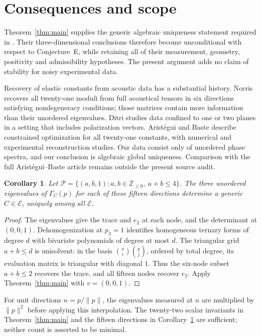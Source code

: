 \documentclass[11pt]{amsart}
\newtheorem{corollary}[theorem]{Corollary}
\theoremstyle{remark}
\newcommand{\E}{\mathcal E}
\begin{document}
\section{Consequences and scope}

Theorem~\ref{thm:main} supplies the generic algebraic uniqueness statement required in \cite[Theorems~A and~B]{dehoop2025}. Their three-dimensional conclusions therefore become unconditional with respect to Conjecture~E, while retaining all of their measurement, geometry, positivity and admissibility hypotheses. The present argument adds no claim of stability for noisy experimental data.

Recovery of elastic constants from acoustic data has a substantial history. Norris \cite{norris1989} recovers all twenty-one moduli from full acoustical tensors in six directions satisfying nondegeneracy conditions; those matrices contain more information than their unordered eigenvalues. Ditri \cite{ditri1994} studies data confined to one or two planes in a setting that includes polarization vectors. Arist\'egui and Baste \cite{aristegui1997} describe constrained optimization for all twenty-one constants, with numerical and experimental reconstruction studies. Our data consist only of unordered phase spectra, and our conclusion is algebraic global uniqueness. Comparison with the full Arist\'egui--Baste article remains outside the present source audit.

\begin{corollary}\label{cor:directions}
Let $\mathcal P=\{(a,b,1):a,b\in\mathbb Z_{\geq0},\ a+b\leq4\}$. The three unordered eigenvalues of $\Gamma_C(p)$ for each of these fifteen directions determine a generic $C\in\E$, uniquely among all $\E$.
\end{corollary}
\begin{proof}
The eigenvalues give the trace and $e_2$ at each node, and the determinant at $(0,0,1)$. Dehomogenization at $p_3=1$ identifies homogeneous ternary forms of degree $d$ with bivariate polynomials of degree at most $d$. The triangular grid $a+b\leq d$ is unisolvent: in the basis $\binom{x}{i}\binom{y}{j}$, ordered by total degree, its evaluation matrix is triangular with diagonal $1$. Thus the six-node subset $a+b\leq2$ recovers the trace, and all fifteen nodes recover $e_2$. Apply Theorem~\ref{thm:main} with $v=(0,0,1)$.
\end{proof}
For unit directions $n=p/\lVert p\rVert$, the eigenvalues measured at $n$ are multiplied by $\lVert p\rVert^2$ before applying this interpolation. The twenty-two scalar invariants in Theorem~\ref{thm:main} and the fifteen directions in Corollary~\ref{cor:directions} are sufficient; neither count is asserted to be minimal.
\end{document}
